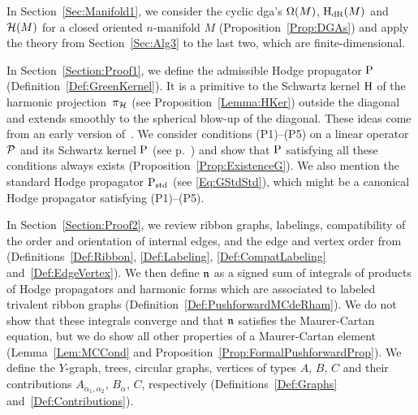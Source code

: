 \documentclass[\MainFolder/Text.tex]{subfiles}
\begin{document}
%

In Section~\ref{Sec:Manifold1}, we consider the cyclic dga's $\Omega(M)$, $\mathrm{H}_{\mathrm{dR}}(M)$ and $\mathcal{H}(M)$ for a closed oriented $n$-manifold $M$ (Proposition~\ref{Prop:DGAs}) and apply the theory from Section~\ref{Sec:Alg3} to the last two, which are finite-dimensional.

In Section~\ref{Section:Proof1}, we define the admissible Hodge propagator $\mathrm{P}$ (Definition~\ref{Def:GreenKernel}). It is a primitive to the Schwartz kernel $\mathrm{H}$ of the harmonic projection~$\pi_{\mathcal{H}}$ (see Proposition~\ref{Lemma:HKer}) outside the diagonal and extends smoothly to the spherical blow-up of the diagonal. These ideas come from an early version of~\cite{Cieliebak2018}. We consider conditions (P1)--(P5) on a linear operator $\mathcal{P}$ and its Schwartz kernel $\mathrm{P}$ (see p.~\pageref{ConditionsG}) and show that $\mathrm{P}$ satisfying all these conditions always exists (Proposition~\ref{Prop:ExistenceG}). We also mention the standard Hodge propagator $\mathrm{P}_{\mathrm{std}}$ (see \eqref{Eq:GStdStd}), which might be a canonical Hodge propagator satisfying (P1)--(P5). 

In Section~\ref{Section:Proof2}, we review ribbon graphs, labelings, compatibility of the order and orientation of internal edges, and the edge and vertex order from~\cite{Cieliebak2015} (Definitions~\ref{Def:Ribbon}, \ref{Def:Labeling}, \ref{Def:CompatLabeling} and~\ref{Def:EdgeVertex}). We then define $\mathfrak{n}$ as a signed sum of integrals of products of Hodge propagators and harmonic forms which are associated to labeled trivalent ribbon graphs (Definition~\ref{Def:PushforwardMCdeRham}). We do not show that these integrals converge and that $\mathfrak{n}$ satisfies the Maurer-Cartan equation, but we do show all other properties of a Maurer-Cartan element (Lemma~\ref{Lem:MCCond} and Proposition~\ref{Prop:FormalPushforwardProp}). We define the $Y$-graph, trees, circular graphs, vertices of types $A$, $B$, $C$ and their contributions $A_{\alpha_1, \alpha_2}$, $B_\alpha$, $C$, respectively (Definitions~\ref{Def:Graphs} and~\ref{Def:Contributions}). 
\end{document}
